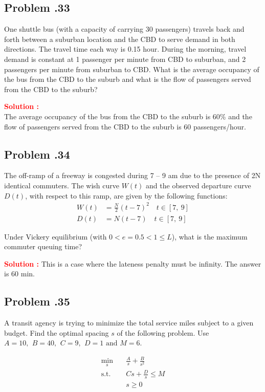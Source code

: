 \documentclass[12pt]{article}
\newcommand{\customsubsection}[1]{
  \subsection*{Problem \thesection.#1}
}
\begin{document}
\customsubsection{33}
One shuttle bus (with a capacity of carrying 30 passengers) travels back and forth between a suburban location and the CBD to serve demand in both directions. The travel time each way is 0.15 hour. During the morning, travel demand is constant at 1 passenger per minute from CBD to suburban, and 2 passengers per minute from suburban to CBD. What is the average occupancy of the bus from the CBD to the suburb and what is the flow of passengers served from the CBD to the suburb? 


\textbf{\textcolor{red}{Solution :}} \\
The average occupancy of the bus from the CBD to the suburb is 60\% and the flow of passengers served from the CBD to the suburb is 60 passengers/hour.

\newpage



\customsubsection{34}
The off-ramp of a freeway is congested during 7 – 9 am due to the presence of 2N identical commuters. The wish curve $W(t)$ and the observed departure curve $D(t)$, with respect to this ramp, are given by the following functions:
\begin{align*}
W\left(t\right)&=\frac{N}{2}{(t-7)}^2 \quad t\in[7,\ 9] \\
D\left(t\right)&=N\left(t-7\right) \quad t\in[7,\ 9]
\end{align*}

Under Vickery equilibrium (with $0 < e=0.5 < 1\leq L$), what is the maximum commuter queuing time?


\textbf{\textcolor{red}{Solution :}} This is a case where the lateness penalty must be infinity. The answer is 60 min. \\


\newpage


\customsubsection{35}
A transit agency is trying to minimize the total service miles subject to a given budget. Find the optimal spacing $s$ of the following problem. Use $A=10, \,\ B=40, \,\  C=9,\,\ D=1 \text{ and } M=6$.

\begin{equation*}
\begin{aligned}
\min_{s} \quad & \frac{A}{s} + \frac{B}{s^2}\\
\textrm{s.t.} \quad &  Cs +\frac{D}{s} \leq M\\
  & s \geq 0    \\
\end{aligned}
\end{equation*}
\end{document}
